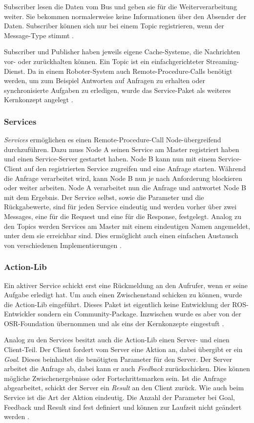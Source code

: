 Subscriber lesen die Daten vom Bus und geben sie für die Weiterverarbeitung weiter. Sie bekommen normalerweise keine Informationen über den Absender der Daten. Subscriber können sich nur bei einem Topic registrieren, wenn der Message-Type stimmt \citep{roswiki}.

Subscriber und Publisher haben jeweils eigene Cache-Systeme, die Nachrichten vor- oder zurückhalten können. Ein Topic ist ein einfachgerichteter Streaming-Dienst. Da in einem Roboter-System auch Remote-Procedure-Calls benötigt werden, um zum Beispiel Antworten auf Anfragen zu erhalten oder synchronisierte Aufgaben zu erledigen, wurde das Service-Paket als weiteres Kernkonzept angelegt \citep{roswiki}.

\subsubsection{Services}

\textit{Services} ermöglichen es einen Remote-Procedure-Call Node-übergreifend durchzuführen. Dazu muss Node A seinen Service am Master registriert haben und einen Service-Server gestartet haben. Node B kann nun mit einem Service-Client auf den registrierten Service zugreifen und eine Anfrage starten. Während die Anfrage verarbeitet wird, kann Node B nun je nach Anforderung blockieren oder weiter arbeiten. Node A verarbeitet nun die Anfrage und antwortet Node B mit dem Ergebnis. Der Service selbst, sowie die Parameter und die Rückgabewerte, sind für jeden Service eindeutig und werden vorher über zwei Messages, eine für die Request und eine für die Response, festgelegt. Analog zu den Topics werden Services am Master mit einem eindeutigen Namen angemeldet, unter dem sie erreichbar sind. Dies ermöglicht auch einen einfachen Austausch von verschiedenen Implementierungen \citep{roswiki}.

\subsubsection{Action-Lib}
\label{sec:basic-ros-action}
Ein aktiver Service schickt erst eine Rückmeldung an den Aufrufer, wenn er seine Aufgabe erledigt hat. Um auch einen Zwischenstand schicken zu können, wurde die Action-Lib eingeführt. Dieses Paket ist eigentlich keine Entwicklung der ROS-Entwickler sondern ein Community-Package. Inzwischen wurde es aber von der OSR-Foundation übernommen und als eins der Kernkonzepte eingestuft \citep{roswiki}.

Analog zu den Services besitzt auch die Action-Lib einen Server- und einen Client-Teil. Der Client fordert vom Server eine Aktion an, dabei übergibt er ein \textit{Goal}. Dieses beinhaltet die benötigten Parameter für den Server. Der Server arbeitet die Anfrage ab, dabei kann er auch \textit{Feedback} zurückschicken. Dies können mögliche Zwischenergebnisse oder Fortschrittsmarken sein. Ist die Anfrage abgearbeitet, schickt der Server ein \textit{Result} an den Client zurück. Wie auch beim Service ist die Art der Aktion eindeutig. Die Anzahl der Parameter bei Goal, Feedback und Result sind fest definiert und können zur Laufzeit nicht geändert werden \citep{roswiki}.